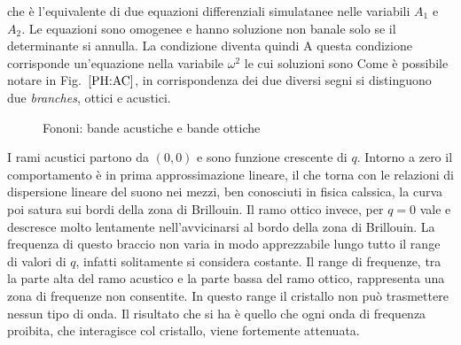 che è l'equivalente di due equazioni differenziali simulatanee nelle variabili $A_1$ e $A_2$. Le equazioni sono omogenee e hanno soluzione non banale solo se il determinante si annulla. La condizione diventa quindi
A questa condizione corrisponde un'equazione nella variabile $\omega^2$ le cui soluzioni sono
Come è possibile notare in Fig.~$\ref{PH:AC}$, in corrispondenza dei due diversi segni si distinguono due \textit{branches}, ottici e acustici.
\begin{figure}
	\centering
	\caption{Fononi: bande acustiche e bande ottiche}
	\label{PH:AC}
\end{figure}
I rami acustici partono da $(0,0)$ e sono funzione crescente di $q$. Intorno a zero il comportamento è in prima approssimazione lineare, il che torna con le relazioni di dispersione lineare del suono nei mezzi, ben conosciuti in fisica calssica, la curva poi satura sui bordi della zona di Brillouin. Il ramo ottico invece, per $q=0$ vale 
e descresce molto lentamente nell'avvicinarsi al bordo della zona di Brillouin. La frequenza di questo braccio non varia in modo apprezzabile lungo tutto il range di valori di $q$, infatti solitamente si considera costante. Il range di frequenze, tra la parte alta del ramo acustico e la parte bassa del ramo ottico, rappresenta una zona di frequenze non consentite. In questo range il cristallo non può trasmettere nessun tipo di onda. Il risultato che si ha è quello che ogni onda di frequenza proibita, che interagisce col cristallo, viene fortemente attenuata.
